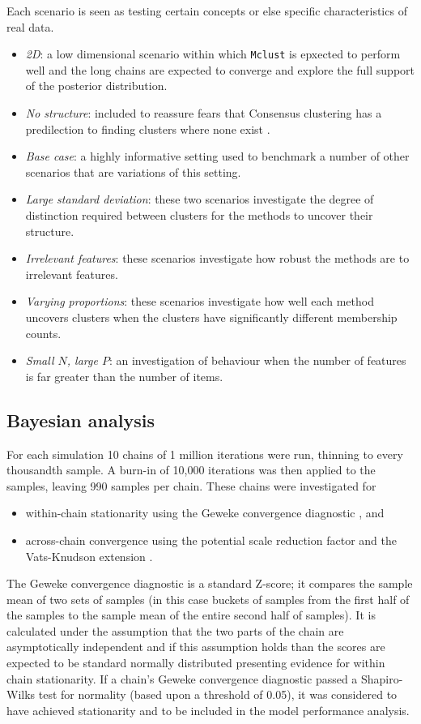 \documentclass[]{article}
\begin{document}
Each scenario is seen as testing certain concepts or else specific characteristics of real data. 
\begin{itemize}
	\item \emph{2D}: a low dimensional scenario within which \texttt{Mclust} is epxected to perform well and the long chains are expected to converge and explore the full support of the posterior distribution.
	\item \emph{No structure}: included to reassure fears that Consensus clustering has a predilection to finding clusters where none exist \citep{senbabaoglu2014reassessment,senbabaouglu2014critical}.
	\item \emph{Base case}: a highly informative setting used to benchmark a number of other scenarios that are variations of this setting.
	\item \emph{Large standard deviation}: these two scenarios investigate the degree of distinction required between clusters for the methods to uncover their structure.
	\item \emph{Irrelevant features}: these scenarios investigate how robust the methods are to irrelevant features.
	\item \emph{Varying proportions}: these scenarios investigate how well each method uncovers clusters when the clusters have significantly different membership counts.
	\item \emph{Small $N$, large $P$}: an investigation of behaviour when the number of features is far greater than the number of items.
\end{itemize}

\subsection{Bayesian analysis} \label{sec:simBayesianAnalysis}
For each simulation 10 chains of 1 million iterations were run, thinning to every thousandth sample. A burn-in of 10,000 iterations was then applied to the samples, leaving 990 samples per chain. These chains were investigated for 
\begin{itemize}
	\item within-chain stationarity using the Geweke convergence diagnostic \citep{geweke1991evaluating}, and
	\item across-chain convergence using the potential scale reduction factor \citep[$\hat{R}$, ][]{gelman1992inference} and the Vats-Knudson extension \citep[\emph{stable $\hat{R}$},][]{vats2018revisiting}.
\end{itemize}
The Geweke convergence diagnostic is a standard Z-score; it compares the sample mean of two sets of samples (in this case buckets of samples from the first half of the samples to the sample mean of the entire second half of samples). It is calculated under the assumption that the two parts of the chain are asymptotically independent and if this assumption holds than the scores are expected to be standard normally distributed presenting evidence for within chain stationarity. If a chain's Geweke convergence diagnostic passed a Shapiro-Wilks test for normality \citep{shapiro1965analysis} (based upon a threshold of 0.05), it was considered to have achieved stationarity and to be included in the model performance analysis. 
\end{document}
